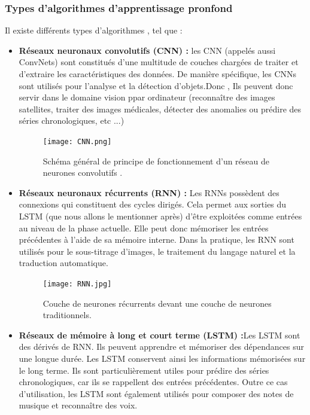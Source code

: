  \subsubsection{Types d'algorithmes d'apprentissage pronfond}
 Il existe différents types d'algorithmes , tel que \cite{algorithmes_deep_learning} :
 \begin{itemize}[label=$\bullet$]
\item \textbf{Réseaux neuronaux convolutifs (CNN) :}
les CNN (appelés aussi ConvNets) sont constitués d'une multitude de couches chargées de traiter et d'extraire les caractéristiques des données. De manière spécifique, les CNNs sont utilisés pour l'analyse et la détection d'objets.Donc , Ils peuvent donc servir dans le domaine vision ppar ordinateur (reconnaître des images satellites, traiter des images médicales, détecter des anomalies ou prédire des séries chronologiques, etc ...)

    \begin{figure}[htbp]
    \centering
    \texttt{[image: CNN.png]}
    \caption{Schéma général de principe de fonctionnement d'un réseau de neurones convolutifs \cite{fernandez_maloigne2019}.}
    \label{fig:example14}
    \end{figure}

\item \textbf{Réseaux neuronaux récurrents (RNN) :}
Les RNNs possèdent des connexions qui constituent des cycles dirigés. Cela permet aux sorties du LSTM (que nous allons le mentionner après) d'être exploitées comme entrées au niveau de la phase actuelle. Elle peut donc mémoriser les entrées précédentes à l'aide de sa mémoire interne. Dans la pratique, les RNN sont utilisés pour le sous-titrage d'images, le traitement du langage naturel et la traduction automatique.

    \begin{figure}[htbp]
    \centering
    \texttt{[image: RNN.jpg]}
    \caption{Couche de neurones récurrents devant une couche de neurones traditionnels.
    \cite{LSTM}}
    \label{fig:example15}
     \end{figure}
     \newpage

 
\item \textbf{Réseaux de mémoire à long et court terme (LSTM) :}Les LSTM sont des dérivés de RNN. Ils peuvent apprendre et mémoriser des dépendances sur une longue durée. Les LSTM conservent ainsi les informations mémorisées sur le long terme. Ils sont particulièrement utiles pour prédire des séries chronologiques, car ils se rappellent des entrées précédentes. Outre ce cas d'utilisation, les LSTM sont également utilisés pour composer des notes de musique et reconnaître des voix.


\end{itemize}
